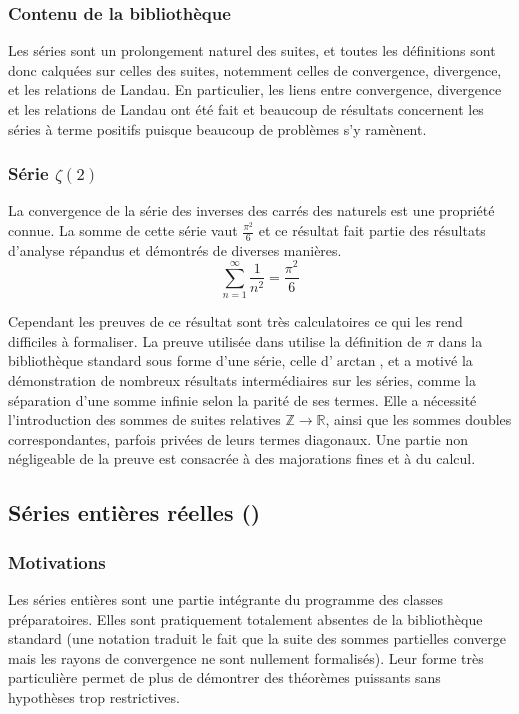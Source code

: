 \subsubsection{Contenu de la bibliothèque}

Les séries sont un prolongement naturel des suites, et toutes les définitions sont donc calquées sur celles des suites, notemment celles de convergence, divergence, et les relations de Landau.
En particulier, les liens entre convergence, divergence et les relations de Landau ont été fait et beaucoup de résultats concernent les séries à terme positifs puisque beaucoup de problèmes s'y ramènent.

\subsubsection{Série $\zeta(2)$}

La convergence de la série des inverses des carrés des naturels est une propriété connue. La somme de cette série vaut $\frac{\pi^2}6$ et ce résultat fait partie des résultats d'analyse répandus et démontrés de diverses manières.
\[\sum_{n=1}^{\infty}{\frac1{n^2}} = \frac{\pi^2}6\]

Cependant les preuves de ce résultat sont très calculatoires ce qui les rend difficiles à formaliser. La preuve utilisée dans  utilise la définition de $\pi$ dans la bibliothèque standard sous forme d'une série, celle d'$\arctan$, et a motivé la démonstration de nombreux résultats intermédiaires sur les séries, comme la séparation d'une somme infinie selon la parité de ses termes. Elle a nécessité l'introduction des sommes de suites relatives $\mathbb{Z}\rightarrow\mathbb{R}$, ainsi que les sommes doubles correspondantes, parfois privées de leurs termes diagonaux. Une partie non négligeable de la preuve est consacrée à des majorations fines et à du calcul.

\subsection{Séries entières réelles ()}

\subsubsection{Motivations}

Les séries entières sont une partie intégrante du programme des classes préparatoires. Elles sont pratiquement totalement absentes de la bibliothèque standard (une notation  traduit le fait que la suite des sommes partielles converge mais les rayons de convergence ne sont nullement formalisés). Leur forme très particulière permet de plus de démontrer des théorèmes puissants sans hypothèses trop restrictives.

